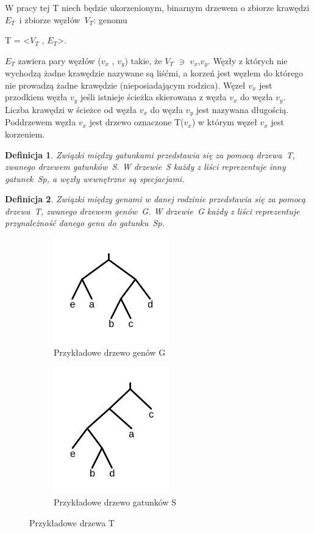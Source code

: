 \documentclass[licencjacka]{pracamgr}
\newtheorem{defi}{Definicja}[section]
\begin{document}
W pracy tej T niech będzie ukorzenionym, binarnym drzewem o zbiorze krawędzi $E_T$~i zbiorze węzłów~$V_T$: genomu
\begin{center}
T = <$V_T$ , $E_T$>.
\end{center}
$E_T$ zawiera pary węzłów ($v_x$ , $v_y$) takie, że $V_T$ $\ni$ $v_x$,$v_y$. Węzły z których nie wychodzą żadne krawędzie nazywane są liśćmi, a korzeń jest węzłem do którego nie prowadzą żadne krawędzie (nieposiadającym rodzica). Węzeł $v_x$ jest przodkiem węzła $v_y$ jeśli istnieje ścieżka skierowana z węzła $v_x$ do węzła $v_y$. Liczba krawędzi w ścieżce od węzła $v_x$ do węzła $v_y$ jest nazywana długością. Poddrzewem węzła $v_x$ jest drzewo oznaczone T($v_x$) w którym węzeł $v_x$ jest korzeniem.


\begin{defi}\label{Drzewa gatunków}
  Związki między gatunkami przedstawia się za pomocą drzewa~T, zwanego drzewem gatunków~S. W drzewie~S każdy z liści reprezentuje inny gatunek~Sp, a węzły wewnętrzne są specjacjami.
\end{defi}

\begin{defi}\label{Drzewa genów}
  Związki między genami w danej rodzinie przedstawia się za pomocą drzewa~T, zwanego drzewem genów~G. W drzewie~G każdy z liści reprezentuje przynależność danego genu do gatunku~Sp.
\end{defi}


\begin{figure}[H]
\centering
\begin{subfigure}{.5\textwidth}
  \centering
  \includegraphics[width=50mm]{./pictures/gene.png}
  \caption{Przykładowe drzewo genów G}
  \label{fig:sub2}
\end{subfigure}%
\begin{subfigure}{.5\textwidth}
  \centering
  \includegraphics[width=50mm]{./pictures/species.png}
  \caption{Przykładowe drzewo gatunków S}
  \label{fig:sub1}
\end{subfigure}%
\caption{Przykładowe drzewa T \cite{gsevol}}
\label{fig:test}
\end{figure}
\end{document}
